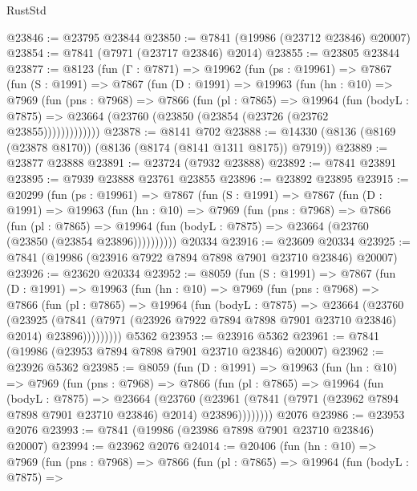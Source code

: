 \begin{lexlean}{RustStd}
\begin{coremodule}
{\begin{coremodule}
{{{{{{{{{{{{{{{{{{{{{{{{{{{{{{{{{{{{{{{{{{{{{{{{{{{{{{@23846 := @23795 @23844
@23850 := @7841 (@19986 (@23712 @23846) @20007)
@23854 := @7841 (@7971 (@23717 @23846) @2014)
@23855 := @23805 @23844
@23877 := @8123
    (fun (Γ : @7871) =>
    @19962
      (fun (ps : @19961) =>
      @7867
        (fun (S : @1991) =>
        @7867
          (fun (D : @1991) =>
          @19963
            (fun (hn : @10) =>
            @7969
              (fun (pns : @7968) =>
              @7866
                (fun (pl : @7865) =>
                @19964
                  (fun (bodyL : @7875) =>
                  @23664 (@23760 (@23850 (@23854 (@23726 (@23762 @23855)))))))))))))
@23878 := @8141 @702
@23888 := @14330 (@8136 (@8169 (@23878 @8170)) (@8136 (@8174 (@8141 @1311 @8175)) @7919))
@23889 := @23877 @23888
@23891 := @23724 (@7932 @23888)
@23892 := @7841 @23891
@23895 := @7939 @23888 @23761 @23855
@23896 := @23892 @23895
@23915 := @20299
    (fun (ps : @19961) =>
    @7867
      (fun (S : @1991) =>
      @7867
        (fun (D : @1991) =>
        @19963
          (fun (hn : @10) =>
          @7969
            (fun (pns : @7968) =>
            @7866
              (fun (pl : @7865) =>
              @19964 (fun (bodyL : @7875) => @23664 (@23760 (@23850 (@23854 @23896))))))))))
    @20334
@23916 := @23609 @20334
@23925 := @7841 (@19986 (@23916 @7922 @7894 @7898 @7901 @23710 @23846) @20007)
@23926 := @23620 @20334
@23952 := @8059
    (fun (S : @1991) =>
    @7867
      (fun (D : @1991) =>
      @19963
        (fun (hn : @10) =>
        @7969
          (fun (pns : @7968) =>
          @7866
            (fun (pl : @7865) =>
            @19964
              (fun (bodyL : @7875) =>
              @23664
                (@23760
                  (@23925
                    (@7841
                      (@7971 (@23926 @7922 @7894 @7898 @7901 @23710 @23846) @2014)
                      @23896)))))))))
    @5362
@23953 := @23916 @5362
@23961 := @7841 (@19986 (@23953 @7894 @7898 @7901 @23710 @23846) @20007)
@23962 := @23926 @5362
@23985 := @8059
    (fun (D : @1991) =>
    @19963
      (fun (hn : @10) =>
      @7969
        (fun (pns : @7968) =>
        @7866
          (fun (pl : @7865) =>
          @19964
            (fun (bodyL : @7875) =>
            @23664
              (@23760
                (@23961 (@7841 (@7971 (@23962 @7894 @7898 @7901 @23710 @23846) @2014) @23896))))))))
    @2076
@23986 := @23953 @2076
@23993 := @7841 (@19986 (@23986 @7898 @7901 @23710 @23846) @20007)
@23994 := @23962 @2076
@24014 := @20406
    (fun (hn : @10) =>
    @7969
      (fun (pns : @7968) =>
      @7866
        (fun (pl : @7865) =>
        @19964
          (fun (bodyL : @7875) =>
}}}}}}}}}}}}}}}}}}}}}}}}}}}}}}}}}}}}}}}}}}}}}}}}}}}}}}
\end{coremodule}}
\end{coremodule}
\end{lexlean}
